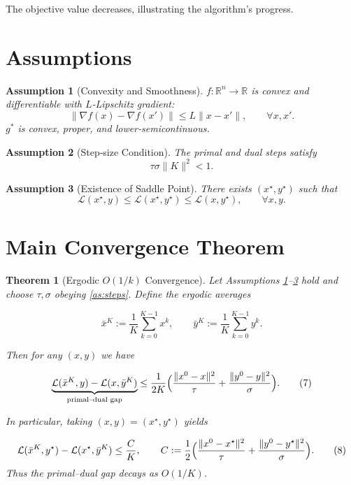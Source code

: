 \documentclass{article}
\newtheorem{theorem}{Theorem}
\newtheorem{assumption}{Assumption}
\begin{document}
The objective value decreases, illustrating the algorithm’s progress.

\section*{Assumptions}
\begin{assumption}[Convexity and Smoothness]\label{as:convex}
$f:\mathbb R^{n}\!\to\!\mathbb R$ is convex and differentiable with $L$‑Lipschitz gradient:
\[
\|\nabla f(x)-\nabla f(x')\|\le L\|x-x'\|,\qquad\forall x,x'.
\]
$g^{*}$ is convex, proper, and lower‑semicontinuous.
\end{assumption}

\begin{assumption}[Step‑size Condition]\label{as:steps}
The primal and dual steps satisfy  
\[
\tau\sigma\|K\|^{2}<1.
\tag{6}
\]
\end{assumption}

\begin{assumption}[Existence of Saddle Point]\label{as:saddle}
There exists $(x^{\star},y^{\star})$ such that  
\[
\mathcal L(x^{\star},y)\le \mathcal L(x^{\star},y^{\star})\le \mathcal L(x,y^{\star}),\qquad\forall x,y.
\]
\end{assumption}

\section*{Main Convergence Theorem}
\begin{theorem}[Ergodic $O(1/k)$ Convergence]\label{thm:ergodic}
Let Assumptions \ref{as:convex}–\ref{as:saddle} hold and choose $\tau,\sigma$ obeying \eqref{as:steps}. Define the ergodic averages  

\[
\bar x^{K}:=\frac{1}{K}\sum_{k=0}^{K-1}x^{k},\qquad 
\bar y^{K}:=\frac{1}{K}\sum_{k=0}^{K-1}y^{k}.
\]

Then for any $(x,y)$ we have  

\[
\underbrace{\mathcal L(\bar x^{K},y)-\mathcal L(x,\bar y^{K})}_{\text{primal–dual gap}}
\le
\frac{1}{2K}\Bigl(\frac{\|x^{0}-x\|^{2}}{\tau}
      +\frac{\|y^{0}-y\|^{2}}{\sigma}\Bigr).
\tag{7}
\]

In particular, taking $(x,y)=(x^{\star},y^{\star})$ yields  

\[
\mathcal L(\bar x^{K},y^{\star})-\mathcal L(x^{\star},\bar y^{K})
\le \frac{C}{K},\qquad C:=\frac{1}{2}\Bigl(\frac{\|x^{0}-x^{\star}\|^{2}}{\tau}
      +\frac{\|y^{0}-y^{\star}\|^{2}}{\sigma}\Bigr).
\tag{8}
\]
Thus the primal–dual gap decays as $O(1/K)$.
\end{theorem}
\end{document}
